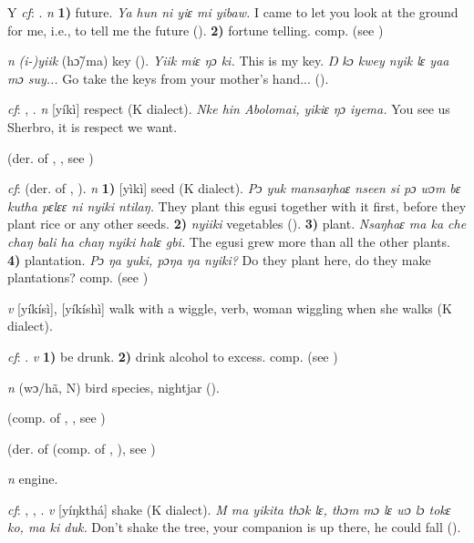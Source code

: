 \begin{letter}{Y}
 \textit{cf}: . \textit{n} \textbf{1)} future. \textit{Ya hun ni yiɛ mi yibaw.} I came to let you look at the ground for me, i.e., to tell me the future (\citealt{Pichl1967}). \textbf{2)} fortune telling. comp.  (see ) 

 \textit{n} \textit{(i-)yiik} (hɔ̃/ma) key (\citealt{Pichl1967}). \textit{Yiik miɛ ŋɔ ki.} This is my key. \textit{Ŋ kɔ kwey nyik lɛ yaa mɔ suy...} Go take the keys from your mother's hand... (\citealt{Pichl1967}).

 \textit{cf}: , . \textit{n} [yíkì] respect (K dialect). \textit{Nke hin Abolomai, yikiɛ ŋɔ iyema.} You see us Sherbro, it is respect we want.

 (der. of , , see ) 

 \textit{cf}:  (der. of , ). \textit{n} \textbf{1)} [yìkì] seed (K dialect). \textit{Pɔ yuk mansaŋhaɛ nseen si pɔ wɔm bɛ kutha pɛlɛɛ ni nyiki ntilaŋ.} They plant this egusi together with it first, before they plant rice or any other seeds. \textbf{2)} \textit{nyiiki} vegetables (\citealt{Pichl1967}). \textbf{3)} plant. \textit{Nsaŋhaɛ ma ka che chaŋ bali ha chaŋ nyiki halɛ gbi.} The egusi grew more than all the other plants. \textbf{4)} plantation. \textit{Pɔ ŋa yuki, pɔŋa ŋa nyiki?} Do they plant here, do they make plantations? comp.  (see ) 

 \textit{v} [yíkísì], [yíkíshì] walk with a wiggle, verb, woman wiggling when she walks (K dialect). 

 \textit{cf}: . \textit{v} \textbf{1)} be drunk. \textbf{2)} drink alcohol to excess. comp.  (see ) 

 \textit{n} (wɔ/hã, N) bird species, nightjar (\citealt{Pichl1967}). 

 (comp. of , , see ) 

 (der. of  (comp. of , ), see ) 

 \textit{n} engine.

 \textit{cf}: , , . \textit{v} [yíŋkthá] shake (K dialect). \textit{M ma yikita thɔk lɛ, thɔm mɔ lɛ wɔ lɔ tokɛ ko, ma ki duk.} Don't shake the tree, your companion is up there, he could fall (\citealt{Pichl1967}).


\end{letter}
